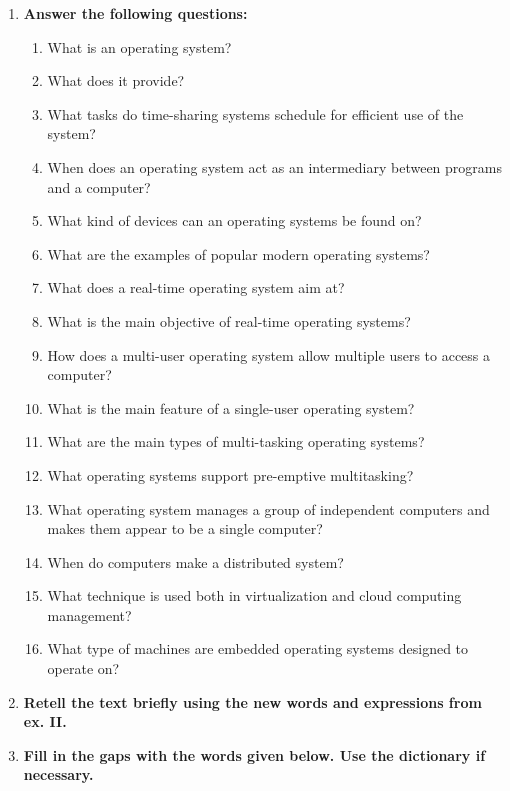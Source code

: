 \documentclass{full}
\begin{document}
\vspace{1ex}
\nexttask
\begin{enumerate}[label=\textbf{\Roman*.},start=\gettask]
  \item \textbf{Answer the following questions:}
    \begin{enumerate}[label=\arabic*.,leftmargin=1ex,itemsep=-0.23ex]
      \item What is an operating system?
      \item What does it provide?
      \item What tasks do time-sharing systems schedule for efficient use of the
        system?
      \item When does an operating system act as an intermediary between
        programs and a computer?
      \item What kind of devices can an operating systems be found on?
      \item What are the examples of popular modern operating systems?
      \item What does a real-time operating system aim at?
      \item What is the main objective of real-time operating systems?
      \item How does a multi-user operating system allow multiple users to
        access a computer?
      \item What is the main feature of a single-user operating system?
      \item What are the main types of multi-tasking operating systems?
      \item What operating systems support pre-emptive multitasking?
      \item What operating system manages a group of independent computers and
        makes them appear to be a single computer?
      \item When do computers make a distributed system?
      \item What technique is used both in virtualization and cloud computing
        management?
      \item What type of machines are embedded operating systems designed to
        operate on?
    \end{enumerate}

  \nexttask
  \item \textbf{Retell the text briefly using the new words and expressions from
    ex. II.}

  \vspace{2ex}
  \nexttask
  \item \textbf{Fill in the gaps with the words given below. Use the dictionary
    if necessary.}
\end{enumerate}
\end{document}
